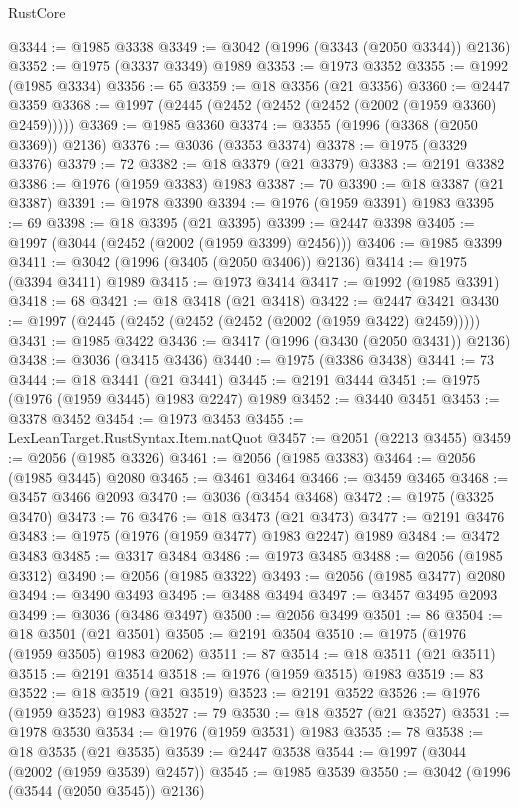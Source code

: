 \begin{lexlean}{RustCore}
\begin{coremodule}
@3344 := @1985 @3338
@3349 := @3042 (@1996 (@3343 (@2050 @3344)) @2136)
@3352 := @1975 (@3337 @3349) @1989
@3353 := @1973 @3352
@3355 := @1992 (@1985 @3334)
@3356 := 65
@3359 := @18 @3356 (@21 @3356)
@3360 := @2447 @3359
@3368 := @1997 (@2445 (@2452 (@2452 (@2452 (@2002 (@1959 @3360) @2459)))))
@3369 := @1985 @3360
@3374 := @3355 (@1996 (@3368 (@2050 @3369)) @2136)
@3376 := @3036 (@3353 @3374)
@3378 := @1975 (@3329 @3376)
@3379 := 72
@3382 := @18 @3379 (@21 @3379)
@3383 := @2191 @3382
@3386 := @1976 (@1959 @3383) @1983
@3387 := 70
@3390 := @18 @3387 (@21 @3387)
@3391 := @1978 @3390
@3394 := @1976 (@1959 @3391) @1983
@3395 := 69
@3398 := @18 @3395 (@21 @3395)
@3399 := @2447 @3398
@3405 := @1997 (@3044 (@2452 (@2002 (@1959 @3399) @2456)))
@3406 := @1985 @3399
@3411 := @3042 (@1996 (@3405 (@2050 @3406)) @2136)
@3414 := @1975 (@3394 @3411) @1989
@3415 := @1973 @3414
@3417 := @1992 (@1985 @3391)
@3418 := 68
@3421 := @18 @3418 (@21 @3418)
@3422 := @2447 @3421
@3430 := @1997 (@2445 (@2452 (@2452 (@2452 (@2002 (@1959 @3422) @2459)))))
@3431 := @1985 @3422
@3436 := @3417 (@1996 (@3430 (@2050 @3431)) @2136)
@3438 := @3036 (@3415 @3436)
@3440 := @1975 (@3386 @3438)
@3441 := 73
@3444 := @18 @3441 (@21 @3441)
@3445 := @2191 @3444
@3451 := @1975 (@1976 (@1959 @3445) @1983 @2247) @1989
@3452 := @3440 @3451
@3453 := @3378 @3452
@3454 := @1973 @3453
@3455 := LexLeanTarget.RustSyntax.Item.natQuot
@3457 := @2051 (@2213 @3455)
@3459 := @2056 (@1985 @3326)
@3461 := @2056 (@1985 @3383)
@3464 := @2056 (@1985 @3445) @2080
@3465 := @3461 @3464
@3466 := @3459 @3465
@3468 := @3457 @3466 @2093
@3470 := @3036 (@3454 @3468)
@3472 := @1975 (@3325 @3470)
@3473 := 76
@3476 := @18 @3473 (@21 @3473)
@3477 := @2191 @3476
@3483 := @1975 (@1976 (@1959 @3477) @1983 @2247) @1989
@3484 := @3472 @3483
@3485 := @3317 @3484
@3486 := @1973 @3485
@3488 := @2056 (@1985 @3312)
@3490 := @2056 (@1985 @3322)
@3493 := @2056 (@1985 @3477) @2080
@3494 := @3490 @3493
@3495 := @3488 @3494
@3497 := @3457 @3495 @2093
@3499 := @3036 (@3486 @3497)
@3500 := @2056 @3499
@3501 := 86
@3504 := @18 @3501 (@21 @3501)
@3505 := @2191 @3504
@3510 := @1975 (@1976 (@1959 @3505) @1983 @2062)
@3511 := 87
@3514 := @18 @3511 (@21 @3511)
@3515 := @2191 @3514
@3518 := @1976 (@1959 @3515) @1983
@3519 := 83
@3522 := @18 @3519 (@21 @3519)
@3523 := @2191 @3522
@3526 := @1976 (@1959 @3523) @1983
@3527 := 79
@3530 := @18 @3527 (@21 @3527)
@3531 := @1978 @3530
@3534 := @1976 (@1959 @3531) @1983
@3535 := 78
@3538 := @18 @3535 (@21 @3535)
@3539 := @2447 @3538
@3544 := @1997 (@3044 (@2002 (@1959 @3539) @2457))
@3545 := @1985 @3539
@3550 := @3042 (@1996 (@3544 (@2050 @3545)) @2136)

\end{coremodule}
\end{lexlean}
